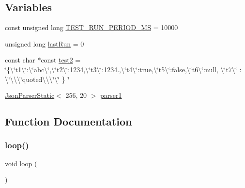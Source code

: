 \subsection*{Variables}
\begin{DoxyCompactItemize}
\item 
const unsigned long \hyperlink{1-parser-_json_parser_generator_r_k_8cpp_a0aa12824a9c1a44e8d9f2499e0ba2698}{T\+E\+S\+T\+\_\+\+R\+U\+N\+\_\+\+P\+E\+R\+I\+O\+D\+\_\+\+MS} = 10000
\item 
unsigned long \hyperlink{1-parser-_json_parser_generator_r_k_8cpp_a5082951a06f690a0623ea99ed4228392}{last\+Run} = 0
\item 
const char $\ast$const \hyperlink{1-parser-_json_parser_generator_r_k_8cpp_a27c66a6ddd571e937494116d9918691b}{test2} = \char`\"{}\{\textbackslash{}\char`\"{}t1\textbackslash{}\char`\"{}\+:\textbackslash{}\char`\"{}abc\textbackslash{}\char`\"{},\textbackslash{}\char`\"{}t2\textbackslash{}\char`\"{}\+:1234,\textbackslash{}\char`\"{}t3\textbackslash{}\char`\"{}\+:1234.,\textbackslash{}\char`\"{}t4\textbackslash{}\char`\"{}\+:true,\textbackslash{}\char`\"{}t5\textbackslash{}\char`\"{}\+:false,\textbackslash{}\char`\"{}t6\textbackslash{}\char`\"{}\+:null, \textbackslash{}\char`\"{}t7\textbackslash{}\char`\"{} \+: \textbackslash{}\char`\"{}\textbackslash{}\textbackslash{}\textbackslash{}\char`\"{}quoted\textbackslash{}\textbackslash{}\textbackslash{}\char`\"{}\textbackslash{}\char`\"{} \} \char`\"{}
\item 
\hyperlink{class_json_parser_static}{Json\+Parser\+Static}$<$ 256, 20 $>$ \hyperlink{1-parser-_json_parser_generator_r_k_8cpp_aa77335196b9c1b8ba3d649f2f381a009}{parser1}
\end{DoxyCompactItemize}


\subsection{Function Documentation}
\mbox{\label{1-parser-_json_parser_generator_r_k_8cpp_afe461d27b9c48d5921c00d521181f12f}} 
\subsubsection{\texorpdfstring{loop()}{loop()}}
{\footnotesize\ttfamily void loop (\begin{DoxyParamCaption}{ }\end{DoxyParamCaption})}



